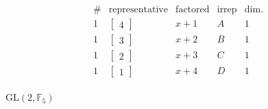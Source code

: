 \documentclass[11pt,oneside]{article}
\newcommand{\GL}{\mathrm{GL}}
\newcommand{\Field}{\mathbb{F}}
\begin{document}
$$
\begin{array}{c|c|c|c|r}
\#    &             \text{representative}  &  \text{factored} & \text{irrep} & \text{dim.}  \\
\hline
1  &  \begin{bmatrix}4\end{bmatrix}   & x+1  & A & 1  \\
1  &  \begin{bmatrix}3\end{bmatrix}   & x+2  & B & 1  \\
1  &  \begin{bmatrix}2\end{bmatrix}   & x+3  & C & 1  \\
1  &  \begin{bmatrix}1\end{bmatrix}   & x+4  & D & 1  \\
\end{array}
$$

$\GL(2,\Field_5)$
\end{document}
